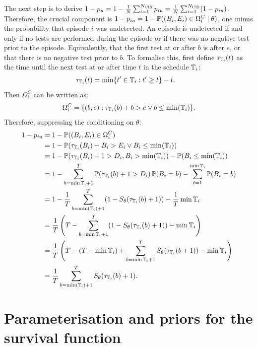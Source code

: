 \documentclass[thesis.tex]{subfiles}
\begin{document}
The next step is to derive $1 - p_u = 1 - \frac{1}{N} \sum_{i=1}^{N_\text{CIS}} p_{iu} = \frac{1}{N} \sum_{i=1}^{N_\text{CIS}} (1 - p_{iu})$.
Therefore, the crucial component is $1 - p_{iu} = 1 - \operatorname{\mathbb{P}}((B_i, E_i) \in \Omega^C_i \mid \theta)$, one minus the probability that episode $i$ was undetected.
An episode is undetected if and only if no tests are performed during the episode or if there was no negative test prior to the episode.
Equivalently, that the first test at or after $b$ is after $e$, or that there is no negative test prior to $b$.
To formalise this, first define $\tau_{\mathbb{T}_i}(t)$ as the time until the next test at or after time $t$ in the schedule $\mathbb{T}_i$:
\begin{align}
\tau_{\mathbb{T}_i}(t) &= \min \{ t' \in \mathbb{T}_i : t' \geq t \} - t.
\end{align}
Then $\Omega^C_i$ can be written as:
\begin{align}
\Omega_i^C = \{ (b, e) : \tau_{\mathbb{T}_i}(b) + b > e \vee b \leq \min(\mathbb{T}_i) \}.
\end{align}
Therefore, suppressing the conditioning on $\theta$:
\begin{align}
1 - p_{iu}
&= 1 - \operatorname{\mathbb{P}}((B_i, E_i) \in \Omega^C_i) \\
&= 1 - \operatorname{\mathbb{P}}( \tau_{\mathbb{T}_i}(B_i) + B_i > E_i \vee B_i \leq \min(\mathbb{T}_i) ) \\
&= 1 - \operatorname{\mathbb{P}}( \tau_{\mathbb{T}_i}(B_i) + 1 > D_i , B_i > \min(\mathbb{T}_i) )  - \operatorname{\mathbb{P}}( B_i \leq \min(\mathbb{T}_i) ) \\
&= 1 - \sum_{b={\min\mathbb{T}_i} + 1}^T \operatorname{\mathbb{P}}( \tau_{\mathbb{T}_i}(b) + 1> D_i) \operatorname{\mathbb{P}}(B_i = b) - \sum_{t=1}^{\min\mathbb{T}_i} \operatorname{\mathbb{P}}(B_i = b)\\
&= 1 - \frac{1}{T} \sum_{b=\min(\mathbb{T}_i)+1}^T (1 - S_\theta(\tau_{\mathbb{T}_i}(b) + 1)) - \frac{1}{T} \min\mathbb{T}_i \\
&= \frac{1}{T} \left(T - \sum_{b=\min\mathbb{T}_i+1}^T (1 - S_\theta(\tau_{\mathbb{T}_i}(b) + 1)) - \min\mathbb{T}_i \right) \\
&= \frac{1}{T} \left(T - (T - \min\mathbb{T}_i) + \sum_{b=\min\mathbb{T}_i+1}^T S_\theta(\tau_{\mathbb{T}_i}(b + 1)) - \min\mathbb{T}_i \right) \\
&= \frac{1}{T} \sum_{b=\min(\mathbb{T}_i)+1}^T S_\theta(\tau_{\mathbb{T}_i}(b) + 1). \label{perf-test:eq:piu}
\end{align}


\section{Parameterisation and priors for the survival function} \label{perf-test:sec:parameters-priors}
\end{document}
